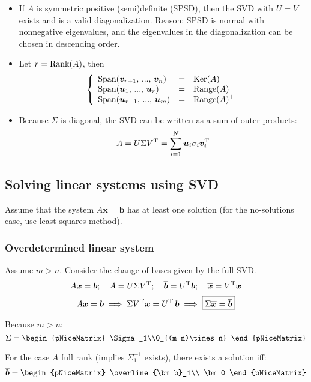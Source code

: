 \documentclass[
  12pt,
  paper=a4,
]{scrartcl} %
\begin{document}
\begin{itemize}
\item If $A$ is symmetric positive (semi)definite (SPSD), then the SVD with $U=V$ exists and is a valid diagonalization. Reason: SPSD is normal with nonnegative eigenvalues, and the eigenvalues in the diagonalization can be chosen in descending order.

\item Let $r=\operatorname{Rank}(A)$, then 
\[
   \left\{
   \begin{array}{lcl}
        \operatorname{Span}(\bm v_{r+1}, \,...,\, \bm v_{n}) &=& \operatorname{Ker}(A)
        \\
        \operatorname{Span}(\bm u_1, \,...,\, \bm u_r) &=& \operatorname{Range}(A)
        \\
        \operatorname{Span}(\bm u_{r+1}, \,...,\, \bm u_{m}) &=& \operatorname{Range}(A)^\perp
   \end{array}
   \right.
\]


\item Because $\Sigma$ is diagonal, the SVD can be written as a sum of outer products:
\[
A = U\Sigma V^{\mathrm{T}} = \sum_{i=1}^N \bm u_i \sigma_i \bm v_i^{\mathrm{T}}
\]


\end{itemize}

\subsection*{Solving linear systems using SVD}

Assume that the system $A\bm x=\bm b$ has at least one solution (for the no-solutions case, use least squares method).

\subsubsection*{Overdetermined linear system}

Assume $m>n$. Consider the change of bases given by the full SVD.
\[
A\bm x = \bm b; \quad A = U\Sigma V^{\mathrm{T}}; \quad
\overline{\bm b} = U^{\mathrm{T}} \bm b;\quad \overline{\bm x} = V^{\mathrm{T}} \bm x
\]
\[
A\bm x = \bm b \implies
\Sigma V^{\mathrm{T}} {\bm x} = U^{\mathrm{T}}\, {\bm b}
\implies
\boxed{\Sigma \overline{\bm x} = \overline{\bm b}}
\]

Because $m>n$:
\[
\Sigma = \begin{pNiceMatrix}
    \Sigma_1\\0_{(m-n)\times n}
\end{pNiceMatrix}
\]

For the case $A$ full rank (implies $\Sigma_1^{-1}$ exists), there exists a solution iff:
\[
\overline{\bm b} = \begin{pNiceMatrix}
    \overline{\bm b}_1\\ \bm 0
\end{pNiceMatrix}
\]
\end{document}
